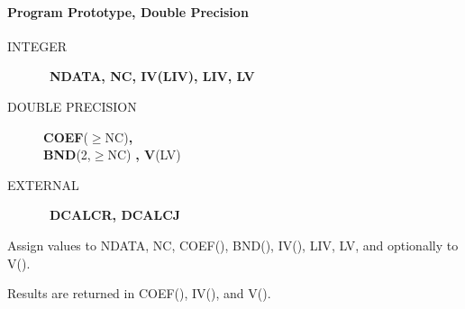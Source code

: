 \documentclass[twoside]{MATH77}
\begin{document}
\paragraph{Program Prototype, Double Precision}
\begin{description}
\item[INTEGER]  \ {\bf NDATA, NC, IV(LIV), LIV, LV}

\item[DOUBLE PRECISION]  {\bf COEF}($\geq $NC){\bf ,\\ BND}(2,$\geq $NC){\bf %
, V}(LV)

\item[EXTERNAL]  \ {\bf DCALCR, DCALCJ}
\end{description}
Assign values to NDATA, NC, COEF(), BND(), IV(), LIV, LV, and optionally to
V().\vspace{-5pt}
\begin{center}
\end{center}
Results are returned in COEF(), IV(), and V().
\end{document}
